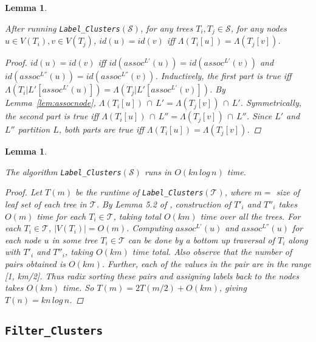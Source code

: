 \documentclass{article}
\newcommand{\leafset}{\Lambda}
\newtheorem{labelclusterscorrectness}[incompatibility]{Lemma}
\newtheorem{labelclustersruntime}[incompatibility]{Lemma}
\begin{document}
    \medskip
    \begin{labelclusterscorrectness}
        \label{lem:labelclusterscorrectness}

        After running \texttt{Label\_Clusters}$(\mathcal{S})$, for any trees $T_i, T_j \in \mathcal{S}$, for any nodes $u \in V(T_i), v \in V(T_j)$, $id(u) = id(v)$ iff $\leafset(T_i[u]) = \leafset(T_j[v])$.

        \begin{proof}
            $id(u) = id(v)$ iff $id(assoc^{L'}(u)) = id(assoc^{L'}(v))$ and $id(assoc^{L''}(u)) = id(assoc^{L''}(v))$. Inductively, the first part is true iff $\leafset(T_i|L'[assoc^{L'}(u)]) = \leafset(T_j|L'[assoc^{L'}(v)])$. By Lemma~\ref{lem:assocnode}, $\leafset(T_i[u])\, \cap\, L' = \leafset(T_j[v])\, \cap\, L'$. Symmetrically, the second part is true iff $\leafset(T_i[u])\, \cap\, L'' = \leafset(T_j[v])\, \cap\, L''$. Since $L'$ and $L''$ partition $L$, both parts are true iff $\leafset(T_i[u]) = \leafset(T_j[v])$.
        \end{proof}
    \end{labelclusterscorrectness}

    \medskip
    \begin{labelclustersruntime}
        \label{lem:labelclustersruntime}

        The algorithm \texttt{Label\_Clusters}$(\mathcal{S})$ runs in $O(kn\,log\,n)$ time.

        \begin{proof}
            Let $T(m)$ be the runtime of \texttt{Label\_Clusters}$(\mathcal{T})$, where $m =$ size of leaf set of each tree in $\mathcal{T}$. By Lemma 5.2 of \cite{farach1995fast}, construction of $T'_i$ and $T''_i$ takes $O(m)$ time for each $T_i \in \mathcal{T}$, taking total $O(km)$ time over all the trees. For each $T_i \in \mathcal{T}$, $|V(T_i)| = O(m)$. Computing $assoc^{L'}(u)$ and $assoc^{L''}(u)$ for each node $u$ in some tree $T_i \in \mathcal{T}$ can be done by a bottom up traversal of $T_i$ along with $T'_i$ and $T''_i$, taking $O(km)$ time total. Also observe that the number of pairs obtained is $O(km)$. Further, each of the values in the pair are in the range [1, km/2]. Thus radix sorting these pairs and assigning labels back to the nodes takes $O(km)$ time. So $T(m) = 2T(m/2) + O(km)$, giving $T(n) = kn\,log\,n$.
        \end{proof}
    \end{labelclustersruntime}

    \subsection{\texttt{Filter\_Clusters}}
\end{document}
